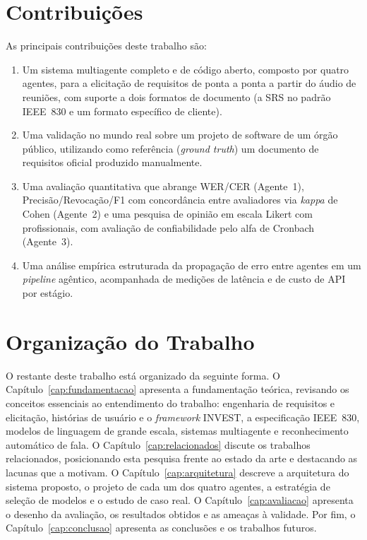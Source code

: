 \section{Contribuições}

As principais contribuições deste trabalho são:

\begin{enumerate}
    \item[1.] Um sistema multiagente completo e de código aberto, composto por quatro agentes, para a elicitação de requisitos de ponta a ponta a partir do áudio de reuniões, com suporte a dois formatos de documento (a SRS no padrão IEEE~830 e um formato específico de cliente).
    \item[2.] Uma validação no mundo real sobre um projeto de software de um órgão público, utilizando como referência (\textit{ground truth}) um documento de requisitos oficial produzido manualmente.
    \item[3.] Uma avaliação quantitativa que abrange WER/CER (Agente~1), Precisão/Revocação/F1 com concordância entre avaliadores via \textit{kappa} de Cohen (Agente~2) e uma pesquisa de opinião em escala Likert com profissionais, com avaliação de confiabilidade pelo alfa de Cronbach (Agente~3).
    \item[4.] Uma análise empírica estruturada da propagação de erro entre agentes em um \textit{pipeline} agêntico, acompanhada de medições de latência e de custo de API por estágio.
\end{enumerate}

\section{Organização do Trabalho}

O restante deste trabalho está organizado da seguinte forma. O Capítulo~\ref{cap:fundamentacao} apresenta a fundamentação teórica, revisando os conceitos essenciais ao entendimento do trabalho: engenharia de requisitos e elicitação, histórias de usuário e o \textit{framework} INVEST, a especificação IEEE~830, modelos de linguagem de grande escala, sistemas multiagente e reconhecimento automático de fala. O Capítulo~\ref{cap:relacionados} discute os trabalhos relacionados, posicionando esta pesquisa frente ao estado da arte e destacando as lacunas que a motivam. O Capítulo~\ref{cap:arquitetura} descreve a arquitetura do sistema proposto, o projeto de cada um dos quatro agentes, a estratégia de seleção de modelos e o estudo de caso real. O Capítulo~\ref{cap:avaliacao} apresenta o desenho da avaliação, os resultados obtidos e as ameaças à validade. Por fim, o Capítulo~\ref{cap:conclusao} apresenta as conclusões e os trabalhos futuros.
